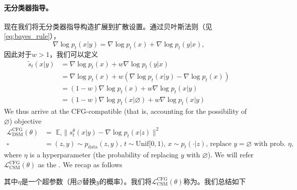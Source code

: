 \paragraph{无分类器指导。} 现在我们将无分类器指导构造扩展到扩散设置。通过贝叶斯法则（见\cref{eq:bayes_rule}），
\begin{equation*}
    \nabla \log p_t(x|y) = \nabla \log p_t(x) + \nabla \log p_t(y|x),
\end{equation*}
因此对于$w > 1$，我们可以定义
\begin{align*}
    \tilde{s}_t(x|y) &= \nabla \log p_t(x) + w \nabla \log p_t(y|x)\\
                    &= \nabla \log p_t(x) + w (\nabla \log p_t(x|y) - \nabla \log p_t(x))\\
                    &= (1-w) \nabla \log p_t(x) + w \nabla \log p_t(x|y)\\
                    &= (1-w) \nabla \log p_t(x|\varnothing) + w \nabla \log p_t(x|y)
\end{align*}
We thus arrive at the CFG-compatible (that is, accounting for the possibility of $\varnothing$) objective 
\begin{align}
    \label{eq:cfg_guided_dsm}
    \mathcal{L}_{\text{DSM}}^{\text{CFG}}(\theta) &= \,\,\mathbb{E}_{\square} \lVert s_t^{\theta}(x|y) - \nabla \log p_t(x|z)\rVert^2\\
    \square &= (z,y) \sim p_{\text{data}}(z,y),\, t \sim \text{Unif}[0,1),\, x \sim p_t(\cdot|z),\,\text{replace }y=\varnothing\text{ with prob. }\eta,
\end{align}
where $\eta$ is a hyperparameter (the probability of replacing $y$ with $\varnothing$). We will refer $\mathcal{L}_{\text{CSM}}^{\text{CFG}}(\theta)$ as the . We recap as follows

其中$\eta$是一个超参数（用$\varnothing$替换$y$的概率）。我们将$\mathcal{L}_{\text{CSM}}^{\text{CFG}}(\theta)$称为。我们总结如下

